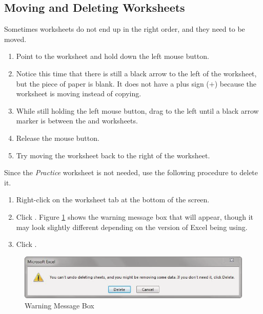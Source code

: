 \subsection{Moving and Deleting Worksheets}

Sometimes worksheets do not end up in the right order, and they need to be moved.

\begin{enumbox}
	\begin{enumerate}
		\item Point to the  worksheet and hold down the left mouse button.
		\item Notice this time that there is still a black arrow to the left of the  worksheet, but the piece of paper is blank. It does not have a plus sign ($ + $) because the worksheet is moving instead of copying.
		\item While still holding the left mouse button, drag to the left until a black arrow marker is between the  and  worksheets.
		\item Release the mouse button.
		\item Try moving the  worksheet back to the right of the  worksheet.
	\end{enumerate}
\end{enumbox}

Since the \textit{Practice} worksheet is not needed, use the following procedure to delete it.

\begin{enumbox}
	\begin{enumerate}
		\item Right-click on the  worksheet tab at the bottom of the screen.
		\item Click . Figure \ref{06:fig03} shows the warning message box that will appear, though it may look slightly different depending on the version of Excel being using. 
		\item Click .
	\end{enumerate}
\end{enumbox}

\begin{figure}[H]
	\centering
	\includegraphics[width=\maxwidth{.95\linewidth}]{gfx/ch06_fig03}
	\caption{Warning Message Box}
	\label{06:fig03}
\end{figure}

